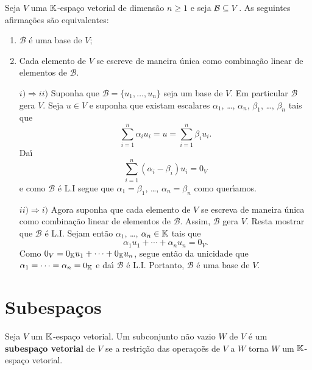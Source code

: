 \begin{proposicao}
	Seja $V$ uma $\mathbb{K}$-espa\c{c}o vetorial de dimens\~ao $n \ge 1$ e seja $\mathcal{B} \subseteq V$. As seguintes afirma\c{c}\~oes s\~ao equivalentes:
	\begin{enumerate}[label={\roman*})]
		\item $\mathcal{B}$ \'e uma base de $V$;
		\item Cada elemento de $V$ se escreve de maneira \'unica como combina\c{c}\~ao linear de elementos de $\mathcal{B}$.
	\end{enumerate}
\end{proposicao}
\begin{prova}
	\begin{itemize}
		\item[$i) \Rightarrow ii)$] Suponha que $\mathcal{B} = \{u_1, \dots,u_n\}$ seja um base de $V$. Em particular $\mathcal{B}$ gera $V$. Seja $u \in V$ e suponha que existam escalares $\alpha_1$, \dots, $\alpha_n$, $\beta_1$, \dots, $\beta_n$ tais que
		\[
			\sum_{i = 1}^n \alpha_iu_i = u = \sum_{i = 1}^n \beta_iu_i.
		\]
		Da{\'\i}
		\[
			\sum_{i = 1}^n (\alpha_i - \beta_i)u_i	 = 0_V
		\]
		e como $\mathcal{B}$ \'e L.I segue que $\alpha_1 = \beta_1$, \dots, $\alpha_n = \beta_n$ como quer{\'\i}amos.
		\item[$ii) \Rightarrow i)$] Agora suponha que cada elemento de $V$ se escreva de maneira \'unica como combina\c{c}\~ao linear de elementos de $\mathcal{B}$. Assim, $\mathcal{B}$ gera $V$. Resta mostrar que $\mathcal{B}$ \'e L.I. Sejam ent\~ao $\alpha_1$, \dots, $\alpha_n \in \mathbb{K}$ tais que
		\[
			\alpha_1u_1 + \cdots + \alpha_nu_n = 0_V.
		\]
		Como $0_V = 0_{\mathbb{K}}u_1 + \cdots + 0_{\mathbb{K}}u_n$, segue ent\~ao da unicidade que $\alpha_1 = \dots = \alpha_n = 0_{\mathbb{K}}$ e da{\'\i} $\mathcal{B}$ \'e L.I. Portanto, $\mathcal{B}$ \'e uma base de $V$.
	\end{itemize}
\end{prova}

\section{Subespa\c{c}os} %
\label{sec:subespacos}

\begin{definicao}
	Seja $V$ um $\mathbb{K}$-espa\c{c}o vetorial. Um subconjunto n\~ao vazio $W$ de $V$ \'e um \textbf{subespa\c{c}o vetorial} de $V$ se a restri\c{c}\~ao das opera\c{c}o\~es de $V$ a $W$ torna $W$ um $\mathbb{K}$-espa\c{c}o vetorial.
\end{definicao}

